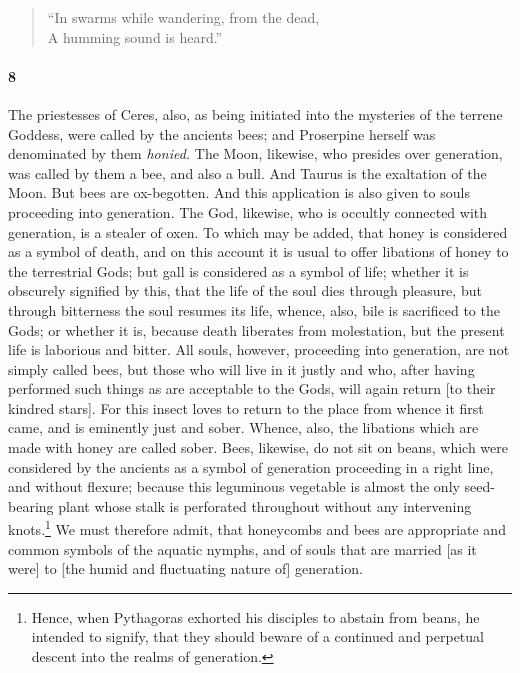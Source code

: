 \documentclass[a4paper,12pt]{article}
\begin{document}
\begin{verse}
``In swarms while wandering, from the dead,\\
A humming sound is heard.''
\end{verse}


\paragraph{8} The priestesses of Ceres, also, as being initiated into the
mysteries of the terrene Goddess, were called by the ancients bees; and
Proserpine herself was denominated by them \textit{honied.} The Moon, likewise,
who presides over generation, was called by them a bee, and also a bull. And
Taurus is the exaltation of the Moon. But bees are ox-begotten. And this
application is also given to souls proceeding into generation. The God,
likewise, who is occultly connected with generation, is a stealer of oxen. To
which may be added, that honey is considered as a symbol of death, and on this
account it is usual to offer libations of honey to the terrestrial Gods; but
gall is considered as a symbol of life; whether it is obscurely signified by
this, that the life of the soul dies through pleasure, but through bitterness
the soul resumes its life, whence, also, bile is sacrificed to the Gods; or
whether it is, because death liberates from molestation, but the present life
is laborious and bitter. All souls, however, proceeding into generation, are
not simply called bees, but those who will live in it justly and who, after
having performed such things as are acceptable to the Gods, will again return
[to their kindred stars]. For this insect loves to return to the place from
whence it first came, and is eminently just and sober. Whence, also, the
libations which are made with honey are called sober. Bees, likewise, do not
sit on beans, which were considered by the ancients as a symbol of generation
proceeding in a right line, and without flexure; because this leguminous
vegetable is almost the only seed-bearing plant whose stalk is perforated
throughout without any intervening knots.\footnote{Hence, when Pythagoras
exhorted his disciples to abstain from beans, he intended to signify, that they
should beware of a continued and perpetual descent into the realms of
generation.} We must therefore admit, that honeycombs and bees are appropriate
and common symbols of the aquatic nymphs, and of souls that are married [as it
were] to [the humid and fluctuating nature of] generation.
\end{document}
